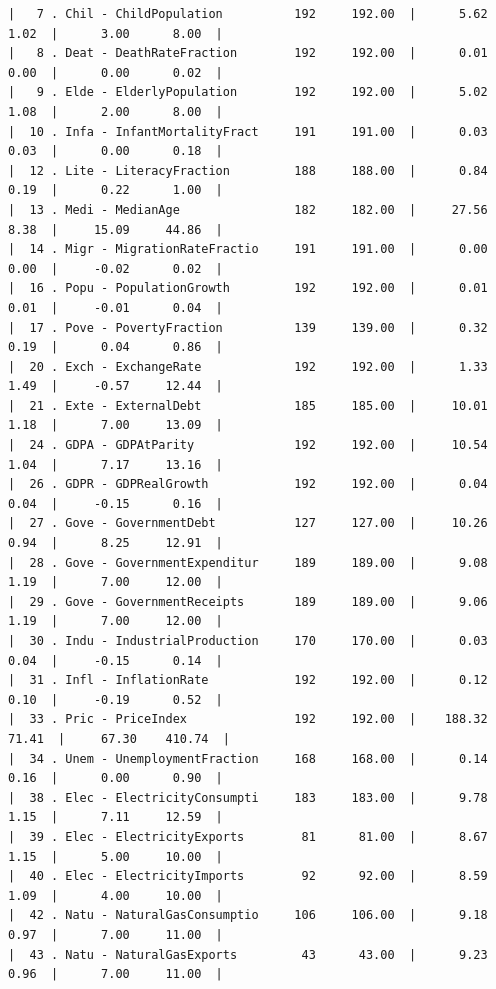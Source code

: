 \documentclass[a4paper,10pt,twocolumn]{article}
\begin{document}
\begin{landscape}
\begin{verbatim}
|   7 . Chil - ChildPopulation          192     192.00  |      5.62      1.02  |      3.00      8.00  |
|   8 . Deat - DeathRateFraction        192     192.00  |      0.01      0.00  |      0.00      0.02  |
|   9 . Elde - ElderlyPopulation        192     192.00  |      5.02      1.08  |      2.00      8.00  |
|  10 . Infa - InfantMortalityFract     191     191.00  |      0.03      0.03  |      0.00      0.18  |
|  12 . Lite - LiteracyFraction         188     188.00  |      0.84      0.19  |      0.22      1.00  |
|  13 . Medi - MedianAge                182     182.00  |     27.56      8.38  |     15.09     44.86  |
|  14 . Migr - MigrationRateFractio     191     191.00  |      0.00      0.00  |     -0.02      0.02  |
|  16 . Popu - PopulationGrowth         192     192.00  |      0.01      0.01  |     -0.01      0.04  |
|  17 . Pove - PovertyFraction          139     139.00  |      0.32      0.19  |      0.04      0.86  |
|  20 . Exch - ExchangeRate             192     192.00  |      1.33      1.49  |     -0.57     12.44  |
|  21 . Exte - ExternalDebt             185     185.00  |     10.01      1.18  |      7.00     13.09  |
|  24 . GDPA - GDPAtParity              192     192.00  |     10.54      1.04  |      7.17     13.16  |
|  26 . GDPR - GDPRealGrowth            192     192.00  |      0.04      0.04  |     -0.15      0.16  |
|  27 . Gove - GovernmentDebt           127     127.00  |     10.26      0.94  |      8.25     12.91  |
|  28 . Gove - GovernmentExpenditur     189     189.00  |      9.08      1.19  |      7.00     12.00  |
|  29 . Gove - GovernmentReceipts       189     189.00  |      9.06      1.19  |      7.00     12.00  |
|  30 . Indu - IndustrialProduction     170     170.00  |      0.03      0.04  |     -0.15      0.14  |
|  31 . Infl - InflationRate            192     192.00  |      0.12      0.10  |     -0.19      0.52  |
|  33 . Pric - PriceIndex               192     192.00  |    188.32     71.41  |     67.30    410.74  |
|  34 . Unem - UnemploymentFraction     168     168.00  |      0.14      0.16  |      0.00      0.90  |
|  38 . Elec - ElectricityConsumpti     183     183.00  |      9.78      1.15  |      7.11     12.59  |
|  39 . Elec - ElectricityExports        81      81.00  |      8.67      1.15  |      5.00     10.00  |
|  40 . Elec - ElectricityImports        92      92.00  |      8.59      1.09  |      4.00     10.00  |
|  42 . Natu - NaturalGasConsumptio     106     106.00  |      9.18      0.97  |      7.00     11.00  |
|  43 . Natu - NaturalGasExports         43      43.00  |      9.23      0.96  |      7.00     11.00  |

\end{verbatim}
\end{landscape}
\end{document}
